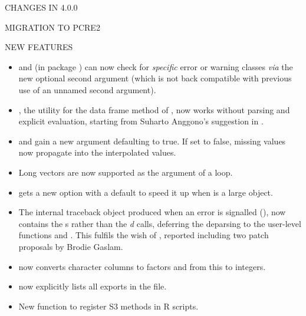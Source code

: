 \documentclass[letterpaper]{book}
\begin{document}
\begin{Section}{ CHANGES IN 4.0.0}
\begin{SubSection}{MIGRATION TO PCRE2}
\end{SubSection}


%
\begin{SubSection}{NEW FEATURES}
\begin{itemize}

\item{}  and  (in package
) can now check for \emph{specific} error or warning
classes \emph{via} the new optional second argument 
(which is not back compatible with previous use of an unnamed second
argument).

\item{} , the utility for the data frame method of
, now works without parsing and explicit evaluation,
starting from Suharto Anggono's suggestion in .

\item{}  and  gain a new argument
 defaulting to true.  If set to false, missing
 values now propagate into the interpolated values.

\item{} Long vectors are now supported as the  argument of
a  loop.

\item{}  gets a new  option with a
default to speed it up when  is a large  object.

\item{} The internal traceback object produced when an error is
signalled (), now contains the s
rather than the \emph{d} calls, deferring the
deparsing to the user-level functions  and
.  This fulfils the wish of , reported
including two patch proposals by Brodie Gaslam.

\item{}  now converts character columns to
factors and from this to integers.

\item{}  now explicitly lists all exports
in the  file.

\item{} New function  to register S3 methods in R
scripts.


\end{itemize}
\end{SubSection}
\end{Section}
\end{document}

